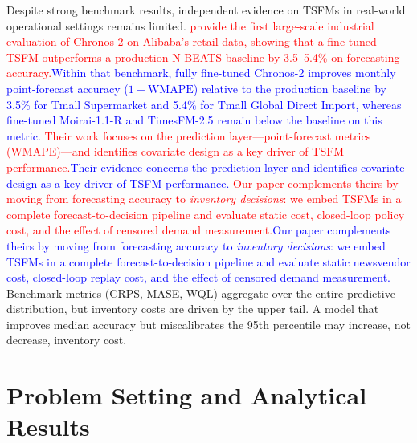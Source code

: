 \documentclass[msom,dblanonrev]{informs4}
\newcommand{\add}[1]{\textcolor{blue}{#1}}
\newcommand{\reduce}[1]{\textcolor{red}{#1}\hspace{0.5em}}
\begin{document}
Despite strong benchmark results, independent evidence on TSFMs in real-world operational settings remains limited.
\reduce{\citet{SuiEtAl2026} provide the first large-scale industrial evaluation of Chronos-2 on Alibaba's retail data, showing that a fine-tuned TSFM outperforms a production N-BEATS baseline by 3.5--5.4\% on forecasting accuracy.}\add{Within that benchmark, fully fine-tuned Chronos-2 improves monthly point-forecast accuracy ($1-\mathrm{WMAPE}$) relative to the production baseline by 3.5\% for Tmall Supermarket and 5.4\% for Tmall Global Direct Import, whereas fine-tuned Moirai-1.1-R and TimesFM-2.5 remain below the baseline on this metric.}
\reduce{Their work focuses on the prediction layer---point-forecast metrics (WMAPE)---and identifies covariate design as a key driver of TSFM performance.}\add{Their evidence concerns the prediction layer and identifies covariate design as a key driver of TSFM performance.}
\reduce{Our paper complements theirs by moving from forecasting accuracy to \emph{inventory decisions}: we embed TSFMs in a complete forecast-to-decision pipeline and evaluate static cost, closed-loop policy cost, and the effect of censored demand measurement.}\add{Our paper complements theirs by moving from forecasting accuracy to \emph{inventory decisions}: we embed TSFMs in a complete forecast-to-decision pipeline and evaluate static newsvendor cost, closed-loop replay cost, and the effect of censored demand measurement.}
Benchmark metrics (CRPS, MASE, WQL) aggregate over the entire predictive distribution, but inventory costs are driven by the upper tail.
A model that improves median accuracy but miscalibrates the 95th percentile may increase, not decrease, inventory cost.


\section{Problem Setting and Analytical Results}\label{sec:setting}
\end{document}
